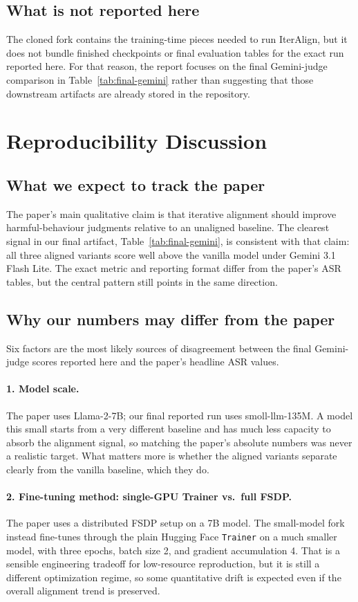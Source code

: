\documentclass[11pt]{article}
\begin{document}
\subsection{What is not reported here}
The cloned fork contains the training-time pieces needed to run IterAlign, but it does not bundle finished checkpoints or final evaluation tables for the exact run reported here. For that reason, the report focuses on the final Gemini-judge comparison in Table~\ref{tab:final-gemini} rather than suggesting that those downstream artifacts are already stored in the repository.

\section{Reproducibility Discussion}
\label{sec:repro}

\subsection{What we expect to track the paper}
The paper's main qualitative claim is that iterative alignment should improve harmful-behaviour judgments relative to an unaligned baseline. The clearest signal in our final artifact, Table~\ref{tab:final-gemini}, is consistent with that claim: all three aligned variants score well above the vanilla model under Gemini 3.1 Flash Lite. The exact metric and reporting format differ from the paper's ASR tables, but the central pattern still points in the same direction.

\subsection{Why our numbers may differ from the paper}
Six factors are the most likely sources of disagreement between the final Gemini-judge scores reported here and the paper's headline ASR values.

\paragraph{1. Model scale.}
The paper uses Llama-2-7B; our final reported run uses smoll-llm-135M. A model this small starts from a very different baseline and has much less capacity to absorb the alignment signal, so matching the paper's absolute numbers was never a realistic target. What matters more is whether the aligned variants separate clearly from the vanilla baseline, which they do.

\paragraph{2. Fine-tuning method: single-GPU Trainer vs.\ full FSDP.}
The paper uses a distributed FSDP setup on a 7B model. The small-model fork instead fine-tunes through the plain Hugging Face \texttt{Trainer} on a much smaller model, with three epochs, batch size 2, and gradient accumulation 4. That is a sensible engineering tradeoff for low-resource reproduction, but it is still a different optimization regime, so some quantitative drift is expected even if the overall alignment trend is preserved.
\end{document}
